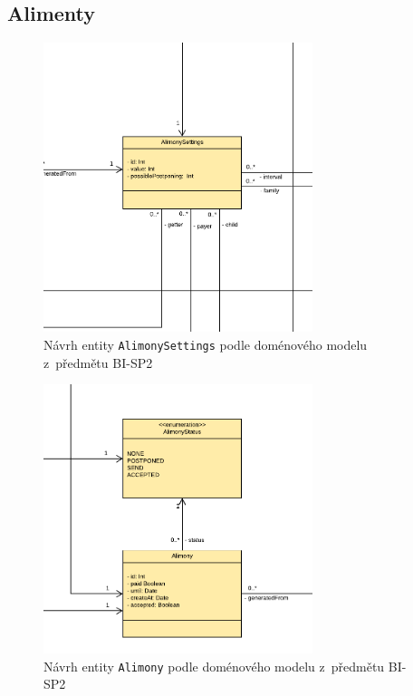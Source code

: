         
    \subsection{Alimenty}
        \begin{figure}\centering
	        \includegraphics[width=0.7\textwidth]{pdfs/AlimonySettings1}
	        \caption[Návrh entity \texttt{AlimonySettings}]{Návrh entity \texttt{AlimonySettings} podle doménového modelu z~předmětu BI-SP2}\label{image:AlimonySettings1}
        \end{figure}
        \begin{figure}\centering
	        \includegraphics[width=0.7\textwidth]{pdfs/Alimony1}
	        \caption[Návrh entity \texttt{Alimony}]{Návrh entity \texttt{Alimony} podle doménového modelu z~předmětu BI-SP2}\label{image:Alimony1}
        \end{figure}
